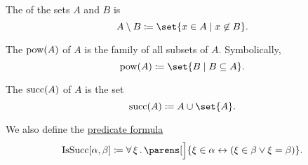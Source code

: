 \begin{definition}
\begin{thmenum}
     The  of the sets \( A \) and \( B \) is
    \begin{equation*}
      A \setminus B \coloneqq \set{ x \in A \given x \not\in B }.
    \end{equation*}

     The  \( \operatorname{pow}(A) \) of \( A \) is the family of all subsets of \( A \). Symbolically,
    \begin{equation*}
      \pow(A) \coloneqq \set{ B \given B \subseteq A }.
    \end{equation*}

     The  \( \operatorname{succ}(A) \) of \( A \) is the set
    \begin{equation*}
      \op{succ}(A) \coloneqq A \cup \set{ A }.
    \end{equation*}

    We also define the \hyperref[rem:predicate_formula]{predicate formula}
    \begin{equation}\label{eq:def:basic_set_operations/successor/predicate}
      \op{IsSucc}[\alpha, \beta] \coloneqq \qforall \xi \parens[\Big]{ \xi \in \alpha \leftrightarrow (\xi \in \beta \vee \xi = \beta) }.
    \end{equation}
  \end{thmenum}
\end{definition}

